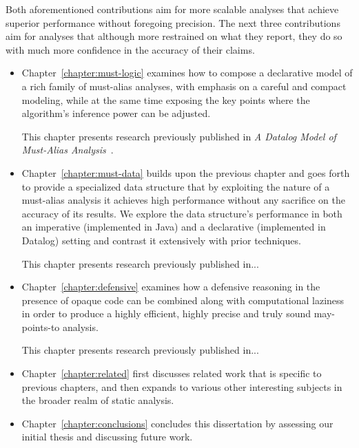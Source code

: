 Both aforementioned contributions aim for more scalable analyses that achieve superior performance without foregoing precision. The next three contributions aim for analyses that although more restrained on what they report, they do so with much more confidence in the accuracy of their claims.

\begin{itemize}[$\bullet$]
\item Chapter~\ref{chapter:must-logic} examines how to compose a declarative model of a rich family of must-alias analyses, with emphasis on a careful and compact modeling, while at the same time exposing the key points where the algorithm's inference power can be adjusted.

This chapter presents research previously published in \emph{A Datalog Model of Must-Alias Analysis}~\cite{soap:2017:Balatsouras}.

\item Chapter~\ref{chapter:must-data} builds upon the previous chapter and goes forth to provide a specialized data structure that by exploiting the nature of a must-alias analysis it achieves high performance without any sacrifice on the accuracy of its results. We explore the data structure's performance in both an imperative (implemented in Java) and a declarative (implemented in Datalog) setting and contrast it extensively with prior techniques.

This chapter presents research previously published in... \todo{}

\item Chapter~\ref{chapter:defensive} examines how a defensive reasoning in the presence of opaque code can be combined along with computational laziness in order to produce a highly efficient, highly precise and truly sound may-points-to analysis.

This chapter presents research previously published in... \todo{}
\end{itemize}

\begin{itemize}[$\bullet$]

\item Chapter~\ref{chapter:related} first discusses related work that is specific to previous chapters, and then expands to various other interesting subjects in the broader realm of static analysis.

\item Chapter~\ref{chapter:conclusions} concludes this dissertation by assessing our initial thesis and discussing future work.
\end{itemize}